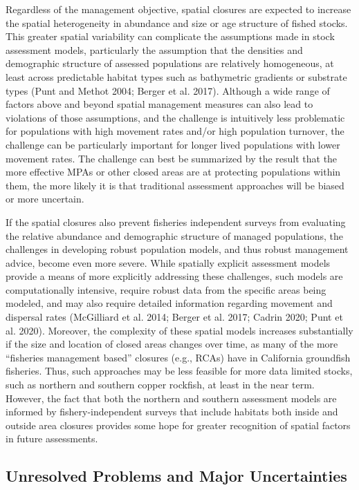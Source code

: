 \documentclass[11pt,
  english,
  letterpaper,
]{article}
\begin{document}
Regardless of the management objective, spatial closures are expected to increase the spatial heterogeneity in abundance and size or age structure of fished stocks. This greater spatial variability can complicate the assumptions made in stock assessment models, particularly the assumption that the densities and demographic structure of assessed populations are relatively homogeneous, at least across predictable habitat types such as bathymetric gradients or substrate types (Punt and Methot 2004; Berger et al. 2017). Although a wide range of factors above and beyond spatial management measures can also lead to violations of those assumptions, and the challenge is intuitively less problematic for populations with high movement rates and/or high population turnover, the challenge can be particularly important for longer lived populations with lower movement rates. The challenge can best be summarized by the result that the more effective MPAs or other closed areas are at protecting populations within them, the more likely it is that traditional assessment approaches will be biased or more uncertain.

If the spatial closures also prevent fisheries independent surveys from evaluating the relative abundance and demographic structure of managed populations, the challenges in developing robust population models, and thus robust management advice, become even more severe. While spatially explicit assessment models provide a means of more explicitly addressing these challenges, such models are computationally intensive, require robust data from the specific areas being modeled, and may also require detailed information regarding movement and dispersal rates (McGilliard et al. 2014; Berger et al. 2017; Cadrin 2020; Punt et al. 2020). Moreover, the complexity of these spatial models increases substantially if the size and location of closed areas changes over time, as many of the more ``fisheries management based'' closures (e.g., RCAs) have in California groundfish fisheries. Thus, such approaches may be less feasible for more data limited stocks, such as northern and southern copper rockfish, at least in the near term. However, the fact that both the northern and southern assessment models are informed by fishery-independent surveys that include habitats both inside and outside area closures provides some hope for greater recognition of spatial factors in future assessments.

\hypertarget{unresolved-problems-and-major-uncertainties-1}{%
\subsection{Unresolved Problems and Major Uncertainties}\label{unresolved-problems-and-major-uncertainties-1}}
\end{document}
